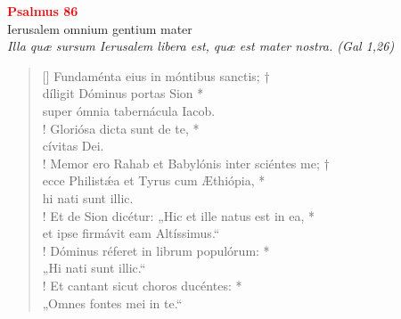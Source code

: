 


\def\greinitialformat#1{%
{\fontsize{39}{39}\selectfont #1}%
}




\vspace{0.3cm}
\begin{center}
 \textcolor{red}{\large \bf Psalmus 86}\\
Ierusalem omnium gentium mater\\
\textit{\small Illa quæ sursum Ierusalem libera est, quæ est mater nostra. (Gal 1,26)}
\end{center}
\begin{verse}[\versewidth]
Fundaménta eius in móntibus sanctis; †\\
díligit Dóminus portas Sion *\\
super ómnia tabernácula Iacob.\\!
\vin Gloriósa dicta sunt de te, *\\
\vin cívitas Dei.\\!
Memor ero Rahab et Babylónis inter sciéntes me; †\\
ecce Philist\'{æ}a et Tyrus cum Æthiópia, *\\
hi nati sunt illic.\\!
\vin Et de Sion dicétur: „Hic et ille natus est in ea, *\\
\vin et ipse firmávit eam Altíssimus.“\\!
Dóminus réferet in librum populórum: *\\
„Hi nati sunt illic.“\\!
\vin Et cantant sicut choros ducéntes: *\\
\vin „Omnes fontes mei in te.“\\
\end{verse}
\vspace{1cm}


